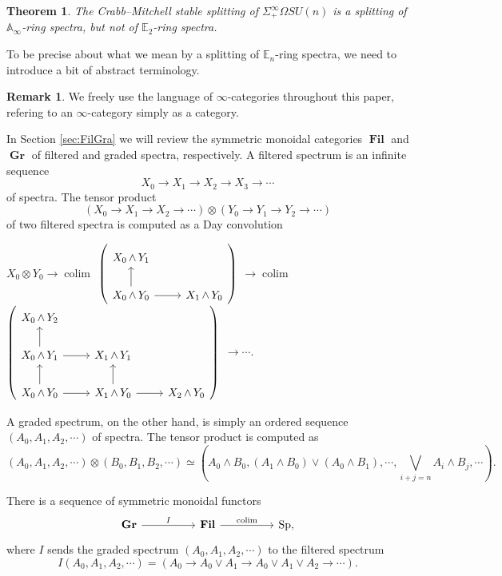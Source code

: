 \documentclass[reqno, oneside]{amsart}
\theoremstyle{definition}
\newtheorem{rmk}[nul]{Remark}
\theoremstyle{plain}
\newtheorem{thm}[nul]{Theorem}
\DeclareMathOperator*{\colim}{\text{colim}}
\DeclareMathOperator{\smsh}{\wedge}
\DeclareMathOperator{\Gr}{\textbf{Gr}}
\DeclareMathOperator{\Fil}{\textbf{Fil}}
\DeclareMathOperator{\Sp}{\text{Sp}}
\begin{document}
\begin{thm}
The Crabb--Mitchell stable splitting of $\Sigma^{\infty}_+ \Omega SU(n)$ is a splitting of $\mathbb{A}_\infty$-ring spectra, but not of $\mathbb{E}_2$-ring spectra.
\end{thm}

To be precise about what we mean by a splitting of $\mathbb{E}_n$-ring spectra, we need to introduce a bit of abstract terminology.

\begin{rmk}
We freely use the language of $\infty$-categories throughout this paper, refering to an $\infty$-category simply as a category.
\end{rmk}

In Section \ref{sec:FilGra} we will review the symmetric monoidal categories $\Fil$ and $\Gr$ of filtered and graded spectra, respectively.  A filtered spectrum is an infinite sequence
$$X_0 \longrightarrow X_1 \longrightarrow X_2 \longrightarrow X_3 \longrightarrow \cdots$$
of spectra.  The tensor product $$\left(X_0 \longrightarrow X_1 \longrightarrow X_2 \longrightarrow \cdots \right) \otimes \left(Y_0 \longrightarrow Y_1 \longrightarrow Y_2 \longrightarrow \cdots \right)$$
of two filtered spectra is computed as a Day convolution

\begin{center}
$X_0 \otimes Y_0 \longrightarrow \colim $
{$ \left(\begin{tikzcd} X_0 \smsh Y_1 \\  X_0 \smsh Y_0 \arrow{u} \arrow{r} & X_1 \smsh Y_0 \end{tikzcd} \right) $} 
$\longrightarrow \colim$
 {$ \left( \begin{tikzcd} X_0 \smsh Y_2 \\ X_0 \smsh Y_1 \arrow{r} \arrow{u} & X_1 \smsh Y_1  \\ X_0 \smsh Y_0 \arrow{r} \arrow{u} & X_1 \smsh Y_0 \arrow{u} \arrow{r} & X_2 \smsh Y_0 \end{tikzcd} \right) $}
$\longrightarrow \cdots.$
\end{center}

A graded spectrum, on the other hand, is simply an ordered sequence $(A_0,A_1,A_2, \cdots)$ of spectra.  The tensor product  is computed as
$$(A_0,A_1,A_2,\cdots) \otimes (B_0,B_1,B_2,\cdots) \simeq \left( A_0 \smsh B_0, (A_1 \smsh B_0) \vee (A_0 \smsh B_1), \cdots, \bigvee_{i+j=n} A_i \smsh B_j, \cdots \right).$$

There is a sequence of symmetric monoidal functors
$$
\begin{tikzcd}[column sep=huge]
\Gr \arrow{r}{I} & \Fil \arrow{r}{\text{colim}} & \Sp,
\end{tikzcd}
$$
where $I$ sends the graded spectrum $(A_0,A_1,A_2,\cdots)$ to the filtered spectrum
$$
I(A_0,A_1,A_2,\cdots) = \left( A_0 \longrightarrow A_0 \vee A_1 \longrightarrow A_0 \vee A_1 \vee A_2 \longrightarrow \cdots\right).
$$
\end{document}
